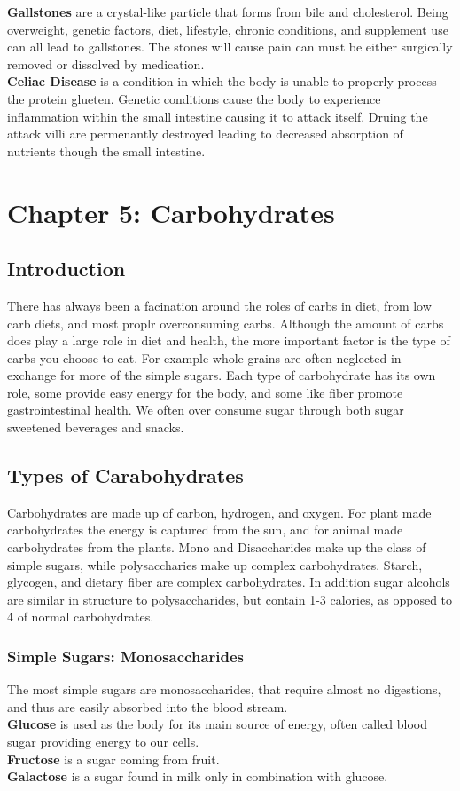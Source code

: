 \documentclass[letterpaper, 11pt]{article}
\begin{document}
\textbf{Gallstones} are a crystal-like particle that forms from bile and cholesterol. Being overweight, genetic factors, diet, lifestyle, chronic conditions, and supplement use can all lead to gallstones. The stones will cause pain can must be either surgically removed or dissolved by medication.\\
\textbf{Celiac Disease} is a condition in which the body is unable to properly process the protein glueten. Genetic conditions cause the body to experience inflammation within the small intestine causing it to attack itself. Druing the attack villi are permenantly destroyed leading to decreased absorption of nutrients though the small intestine.\\
\section{Chapter 5: Carbohydrates}
\label{sec:org2ec059b}
\subsection{Introduction}
\label{sec:orgddf0578}
There has always been a facination around the roles of carbs in diet, from low carb diets, and most proplr overconsuming carbs. Although the amount of carbs does play a large role in diet and health, the more important factor is the type of carbs you choose to eat. For example whole grains are often neglected in exchange for more of the simple sugars. Each type of carbohydrate has its own role, some provide easy energy for the body, and some like fiber promote gastrointestinal health. We often over consume sugar through both sugar sweetened beverages and snacks.\\
\subsection{Types of Carabohydrates}
\label{sec:orgfdc43bd}
Carbohydrates are made up of carbon, hydrogen, and oxygen. For plant made carbohydrates the energy is captured from the sun, and for animal made carbohydrates from the plants. Mono and Disaccharides make up the class of simple sugars, while polysaccharies make up complex carbohydrates. Starch, glycogen, and dietary fiber are complex carbohydrates. In addition sugar alcohols are similar in structure to polysaccharides, but contain 1-3 calories, as opposed to 4 of normal carbohydrates.\\
\subsubsection{Simple Sugars: Monosaccharides}
\label{sec:orgbfc140d}
The most simple sugars are monosaccharides, that require almost no digestions, and thus are easily absorbed into the blood stream.\\
\textbf{Glucose} is used as the body for its main source of energy, often called blood sugar providing energy to our cells.\\
\textbf{Fructose} is a sugar coming from fruit.\\
\textbf{Galactose} is a sugar found in milk only in combination with glucose.\\
\end{document}

